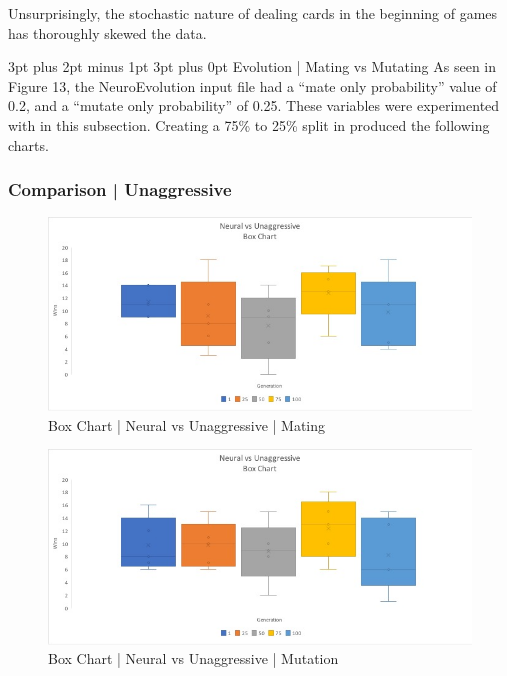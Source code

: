 \documentclass[12pt,a4paper]{article}
\makeatletter
\renewcommand\subsection{\@startsection {subsection}{1}{2mm} %
                               {3pt plus 2pt minus 1pt} %
                               {3pt plus 0pt} %
                               {\normalfont\bfseries}}
\makeatother
\begin{document}
Unsurprisingly, the stochastic nature of dealing cards in the beginning of games has thoroughly skewed the data.

\newpage
\subsection{Evolution | Mating vs Mutating}
As seen in Figure 13, the NeuroEvolution input file had a \enquote{mate only probability} value of 0.2, and a \enquote{mutate only probability} of 0.25. These variables were experimented with in this subsection. Creating a 75\% to 25\% split in produced the following charts.  
\subsubsection{Comparison | Unaggressive}

\begin{figure}[h]
	\centering
	\includegraphics[width = \textwidth]{BoxUna2.jpg}
	\caption{Box Chart | Neural vs Unaggressive | Mating }
\end{figure}

\begin{figure}[h]
	\centering
	\includegraphics[width = \textwidth]{BoxUna3.jpg}
	\caption{Box Chart | Neural vs Unaggressive | Mutation}
\end{figure}
\end{document}
